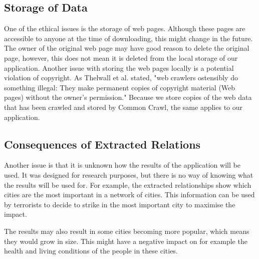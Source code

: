 \subsection{Storage of Data}
One of the ethical issues is the storage of web pages. Although these pages are accessible to anyone at the time of downloading, this might change in the future. The owner of the original web page may have good reason to delete the original page, however, this does not mean it is deleted from the local storage of our application. Another issue with storing the web pages locally is a potential violation of copyright. As Thelwall et al. stated, "web crawlers ostensibly do something illegal: They make permanent copies of copyright material (Web pages) without the owner’s permission."\cite{thelwall2006web} Because we store copies of the web data that has been crawled and stored by Common Crawl, the same applies to our application.

\subsection{Consequences of Extracted Relations}
Another issue is that it is unknown how the results of the application will be used. It was designed for research purposes, but there is no way of knowing what the results will be used for. For example, the extracted relationships show which cities are the most important in a network of cities. This information can be used by terrorists to decide to strike in the most important city to maximise the impact. 

The results may also result in some cities becoming more popular, which means they would grow in size. This might have a negative impact on for example the health and living conditions of the people in these cities.

